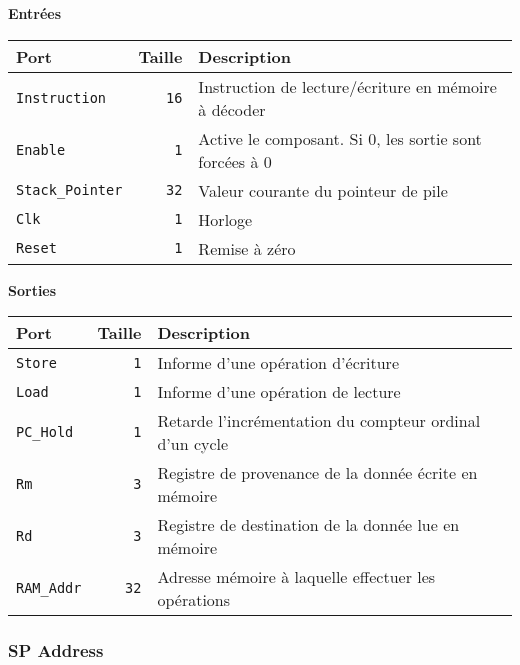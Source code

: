 
\textbf{Entrées}\\

\begin{tabular}{|l|r|l|}
\hline
\textbf{Port}		& \textbf{Taille} & \textbf{Description}\\
\hline

\texttt{Instruction}	& \texttt{16} & Instruction de lecture/écriture en mémoire à décoder\\
\hline
\texttt{Enable}		&  \texttt{1} & Active le composant. Si 0, les sortie sont forcées à 0\\
\hline
\texttt{Stack\_Pointer}	& \texttt{32} & Valeur courante du pointeur de pile\\
\hline
\texttt{Clk}		&  \texttt{1} & Horloge\\
\hline
\texttt{Reset}		&  \texttt{1} & Remise à zéro\\


\hline
\end{tabular}

\vspace{1em}
\textbf{Sorties}\\

\begin{tabular}{|l|r|l|}
\hline 
\textbf{Port} & \textbf{Taille} & \textbf{Description}\\
\hline

\texttt{Store}		&  \texttt{1} & Informe d'une opération d'écriture\\
\hline
\texttt{Load}		&  \texttt{1} & Informe d'une opération de lecture\\
\hline
\texttt{PC\_Hold}	&  \texttt{1} & Retarde l'incrémentation du compteur ordinal d'un cycle\\
\hline
\texttt{Rm}		&  \texttt{3} & Registre de provenance de la donnée écrite en mémoire\\
\hline
\texttt{Rd}		&  \texttt{3} & Registre de destination de la donnée lue en mémoire\\
\hline
\texttt{RAM\_Addr}	& \texttt{32} & Adresse mémoire à laquelle effectuer les opérations\\

\hline
\end{tabular}




\subsubsection{SP Address}

